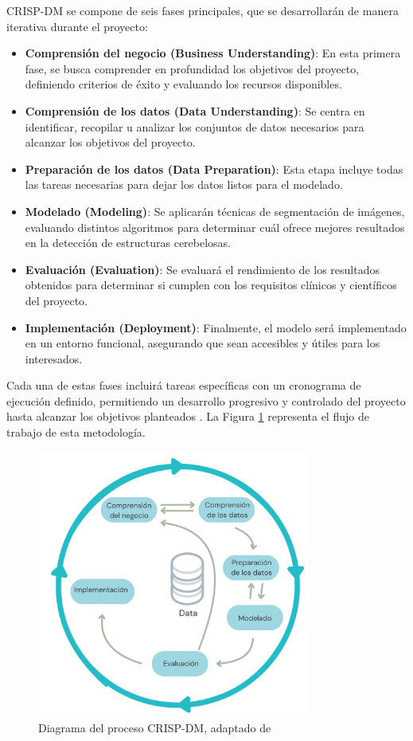 CRISP-DM se compone de seis fases principales, que se desarrollarán de manera iterativa durante el proyecto:
\begin{itemize}
    \item \textbf{Comprensión del negocio (Business Understanding)}: En esta primera fase, se busca comprender en profundidad los objetivos del proyecto, definiendo criterios de éxito y evaluando los recursos disponibles.
    \item \textbf{Comprensión de los datos (Data Understanding)}: Se centra en identificar, recopilar u analizar los conjuntos de datos necesarios para alcanzar los objetivos del proyecto. 
    \item \textbf{Preparación de los datos (Data Preparation)}: Esta etapa incluye todas las tareas necesarias para dejar los datos listos para el modelado.
    \item \textbf{Modelado (Modeling)}: Se aplicarán técnicas de segmentación de imágenes, evaluando distintos algoritmos para determinar cuál ofrece mejores resultados en la detección de estructuras cerebelosas. 
    \item \textbf{Evaluación (Evaluation)}: Se evaluará el rendimiento de los resultados obtenidos para determinar si cumplen con los requisitos clínicos y científicos del proyecto.
    \item \textbf{Implementación (Deployment)}: Finalmente, el modelo será implementado en un entorno funcional, asegurando que sean accesibles y útiles para los interesados.
\end{itemize}
Cada una de estas fases incluirá tareas específicas con un cronograma de ejecución definido, permitiendo un desarrollo progresivo y controlado del proyecto hasta alcanzar los objetivos planteados \cite{crispdm2021}. La Figura \ref{fig:crispdm_diagrama} representa el flujo de trabajo de esta metodología.

\begin{figure}[h]
    \centering
    \includegraphics[width= 0.8\textwidth]{img/cripdm_flujo.png}
    \caption{Diagrama del proceso CRISP-DM, adaptado de \cite{crispdmimage}}
    \label{fig:crispdm_diagrama}
\end{figure}


